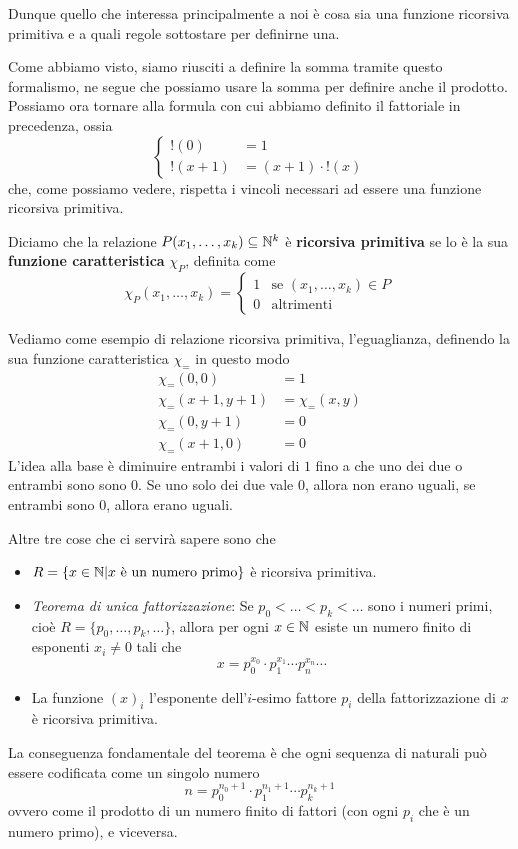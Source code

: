 Dunque quello che interessa principalmente a noi è cosa sia
una funzione ricorsiva primitiva e a quali regole sottostare
per definirne una.

Come abbiamo visto, siamo riusciti a definire la somma tramite
questo formalismo, ne segue che possiamo usare la somma per
definire anche il prodotto. Possiamo ora tornare alla formula
con cui abbiamo definito il fattoriale in precedenza, ossia
\[
	\begin{cases}
		!(0)     & = 1                  \\
		!(x + 1) & = (x + 1) \cdot !(x)
	\end{cases}
\]
che, come possiamo vedere, rispetta i vincoli necessari ad
essere una funzione ricorsiva primitiva.

\begin{definition}
	Diciamo che la relazione $P(x_1, \dots, x_k) \subseteq \mathbb{N}^k$
	è \textbf{ricorsiva primitiva} se lo è la sua
	\textbf{funzione caratteristica} $\chi_P$, definita come
	\[
		\chi_P (x_1, \dots, x_k) = \begin{cases}
			1 & \text{se } (x_1, \dots, x_k) \in P \\
			0 & \text{altrimenti}
		\end{cases}
	\]
\end{definition}

Vediamo come esempio di relazione ricorsiva primitiva,
l'eguaglianza, definendo la sua funzione caratteristica
$\chi_=$ in questo modo
\begin{align*}
	\chi_= (0, 0)     & = 1           \\
	\chi_= (x+1, y+1) & = \chi_=(x,y) \\
	\chi_= (0, y+1)   & = 0           \\
	\chi_= (x+1, 0)   & = 0
\end{align*}
L'idea alla base è diminuire entrambi i valori di $1$ fino a
che uno dei due o entrambi sono sono $0$. Se uno solo dei due
vale $0$, allora non erano uguali, se entrambi sono $0$, allora
erano uguali.

Altre tre cose che ci servirà sapere sono che
\begin{itemize}
	\item $R = \{ x \in \mathbb{N} | x \text{ è un numero primo} \}$
	      è ricorsiva primitiva.
	\item \emph{Teorema di unica fattorizzazione}: Se
	      $p_0 < \dots < p_k < \dots$ sono i numeri primi,
	      cioè $R = \{ p_0, \dots, p_k, \dots \}$, allora per
	      ogni $x \in \mathbb{N}$ esiste un numero finito di esponenti
	      $x_i \neq 0$ tali che
	      \[
		      x = p_0^{x_0} \cdot p_1^{x_1} \cdots
		      p_n^{x_n} \cdots
	      \]
	\item La funzione $(x)_i$ l'esponente dell'$i$-esimo
	      fattore $p_i$ della fattorizzazione di $x$ è
	      ricorsiva primitiva.
\end{itemize}
La conseguenza fondamentale del teorema è che ogni sequenza
di naturali può essere codificata come un singolo numero
\[
	n = p_0^{n_0 + 1} \cdot p_1^{n_1 + 1} \cdots
	p_k^{n_k + 1}
\]
ovvero come il prodotto di un numero finito di fattori (con
ogni $p_i$ che è un numero primo), e viceversa.


